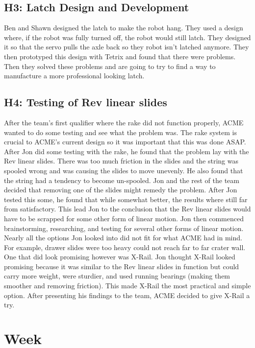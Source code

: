 \documentclass{article}
\begin{document}
\subsection{H3: Latch Design and Development}

Ben and Shawn designed the latch to make the robot hang. They used a design where, if the robot was fully turned off, the robot would still latch. They designed it so that the servo pulls the axle back so they robot isn't latched anymore. They then prototyped this design with Tetrix and found that there were problems. Then they solved these problems and are going to try to find a way to manufacture a more professional looking latch.

\subsection{H4: Testing of Rev linear slides}

After the team's first qualifier where the rake did not function properly, ACME wanted to do some testing and see what the problem was. The rake system is crucial to ACME's current design so it was important that this was done ASAP. After Jon did some testing with the rake, he found that the problem lay with the Rev linear slides. There was too much friction in the slides and the string was spooled wrong and was causing the slides to move unevenly. He also found that the string had a tendency to become un-spooled. Jon and the rest of the team decided that removing one of the slides might remedy the problem. After Jon tested this some, he found that while somewhat better, the results where still far from satisfactory. This lead Jon to the conclusion that the Rev linear slides would have to be scrapped for some other form of linear motion. Jon then commenced brainstorming, researching, and testing for several other forms of linear motion. Nearly all the options Jon looked into did not fit for what ACME had in mind. For example, drawer slides were too heavy could not reach far to far crater wall. One that did look promising however was X-Rail. Jon thought X-Rail looked promising because it was similar to the Rev linear slides in function but could carry more weight, were sturdier, and used running bearings (making them smoother and removing friction). This made X-Rail the most practical and simple option. After presenting his findings to the team, ACME decided to give X-Rail a try. 

\clearpage \newpage \section{Week \thesection} 
\end{document}
